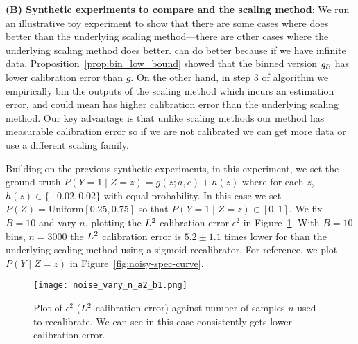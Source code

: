 \textbf{(B) Synthetic experiments to compare \ourcal{} and the scaling method}: We run an illustrative toy experiment to show that there are some cases where \ourcal{} does better than the underlying scaling method---there are other cases where the underlying scaling method does better. \ourcal{} can do better because if we have infinite data, Proposition~\ref{prop:bin_low_bound} showed that the binned version $g_{\mathcal{B}{}}$ has lower calibration error than $g$. On the other hand, in step 3 of \ourcal{} algorithm we empirically bin the outputs of the scaling method which incurs an estimation error, and could mean \ourcal{} has higher calibration error than the underlying scaling method. Our key advantage is that unlike scaling methods our method has measurable calibration error so if we are not calibrated we can get more data or use a different scaling family.

Building on the previous synthetic experiments, in this experiment, we set the ground truth $P(Y = 1 \mid Z=z) = g(z; a, c) + h(z)$ where for each $z$, $h(z) \in \{-0.02, 0.02\}$ with equal probability. In this case we set $P(Z) = \mbox{Uniform}[0.25, 0.75]$ so that $P(Y = 1 \mid Z=z) \in [0, 1]$. We fix $B=10$ and vary $n$, plotting the $L^2$ calibration error $\epsilon^2$ in Figure~\ref{fig:well-spec-vary-b}. With $B=10$ bins, $n = 3000$ the $L^2$ calibration error is $5.2 \pm 1.1$ times lower for \ourcal{} than the underlying scaling method using a sigmoid recalibrator. For reference, we plot $P(Y \mid Z = z)$ in Figure~\ref{fig:noisy-spec-curve}.

\begin{figure}
  \centering
  \texttt{[image: noise\_vary\_n\_a2\_b1.png]}
  \caption{Plot of $\epsilon^2$ ($L^2$ calibration error) against number of samples $n$ used to recalibrate. We can see in this case \ourcal{} consistently gets lower calibration error.
  }
  \label{fig:well-spec-vary-b}
\end{figure}
